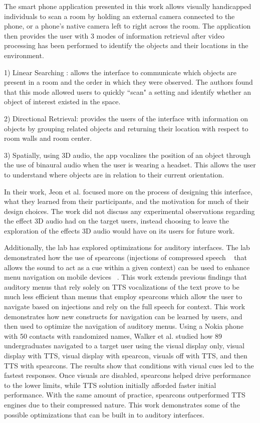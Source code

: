 The smart phone application presented in this work allows visually handicapped
individuals to scan a room by holding an external camera connected to the phone,
or a phone's native camera left to right across the room. The application then
provides the user with 3 modes of information retrieval after video processing
has been performed to identify the objects and their locations in the environment.

1) Linear Searching : allows the interface to communicate which objects are
present in a room and the order in which they were observed.  The authors found
that this mode allowed users to quickly ``scan" a setting and identify whether an
object of interest existed in the space.

2) Directional Retrieval: provides the users of the interface with information
on objects by grouping related objects and returning their location with respect
to room walls and room center.

3) Spatially, using 3D audio, the app vocalizes the position of an object through
the use of binaural audio when the user is wearing a headset. This allows the user
to understand where objects are in relation to their current orientation.

In their work, Jeon et al. focused more on the process of designing this interface,
what they learned from their participants, and the motivation for much of their
design choices.  The work did not discuss any experimental observations regarding
the effect 3D audio had on the target users, instead choosing to leave the
exploration of the effects 3D audio would have on its users for future work.

Additionally, the lab has explored optimizations for auditory interfaces. The
lab demonstrated how the use of spearcons (injections of compressed speech ~\cite{
jeon2009enhanced} that allows the sound to act as a cue within a given context)
can be used to enhance menu navigation on mobile devices ~\cite{
walker2009spearcon}. This work extends previous findings that auditory menus
that rely solely on TTS vocalizations of the text prove to be much less efficient
than menus that employ spearcons which allow the user to navigate based on injections
and rely on the full speech for context.  This work demonstrates how new constructs
for navigation can be learned by users, and then used to optimize the navigation
of auditory menus.  Using a Nokia phone with 50 contacts with randomized names,
Walker et al. studied how 89 undergraduates navigated to a target user using
the visual display only, visual display with TTS, visual display with spearcon,
visuals off with TTS, and then TTS with spearcons. The results show that conditions
with visual cues led to the fastest responses.  Once visuals are disabled, spearcons
helped drive performance to the lower limits, while TTS solution initially afforded
faster initial performance.  With the same amount of practice, spearcons outperformed
TTS engines due to their compressed nature.  This work demonstrates some of the
possible optimizations that can be built in to auditory interfaces.

